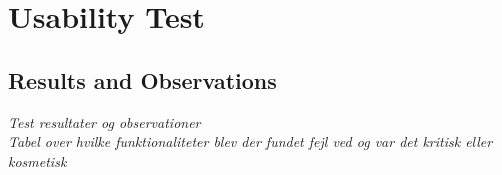 \section{Usability Test}


\subsection{Results and Observations}
\textit{Test resultater og observationer\\
Tabel over hvilke funktionaliteter blev der fundet fejl ved og var det kritisk eller kosmetisk}